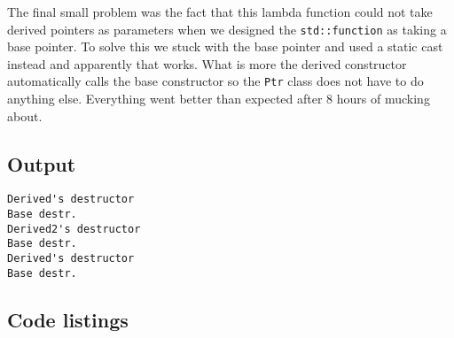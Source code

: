 \documentclass[11pt]{article}
\begin{document}
The final small problem was the fact that this lambda function could not take derived pointers as parameters when we designed the \texttt{std::function} as taking a base pointer.
To solve this we stuck with the base pointer and used a static cast instead and apparently that works.
What is more the derived constructor automatically calls the base constructor so the \texttt{Ptr} class does not have to do anything else.
Everything went better than expected after 8 hours of mucking about.

\subsection*{Output}
\begin{lstlisting}
Derived's destructor
Base destr.
Derived2's destructor
Base destr.
Derived's destructor
Base destr.
\end{lstlisting}

\subsection*{Code listings}


\end{document}
